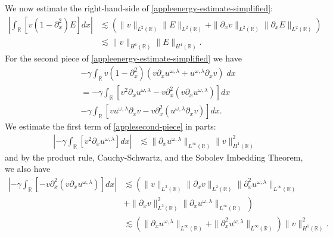 \documentclass[12pt,reqno]{amsart}
\newcommand{\rr}{\mathbb{R}}
\newcommand{\p}{\partial}
\theoremstyle{plain}  %
\theoremstyle{definition}
\begin{document}
We now estimate the right-hand-side of \eqref{appleenergy-estimate-simplified}:
%
\begin{equation}
	\begin{split}
		\label{applefirst_piece}
	\left |\int_{\rr} \left [v (1- \p_x^2)E \right ] dx \right |
	& \lesssim
	\left( \|v\|_{L^2(\rr)}
	\|E\|_{L^2(\rr)} + \|\p_x v \|_{L^2(\rr)}
		\|\p_xE\|_{L^2(\rr)}\right)
	\\
	&
	\lesssim
	\|v\|_{H^1(\rr)} \|E\|_{H^1(\rr)}.
\end{split}
\end{equation}
For the second piece of \eqref{appleenergy-estimate-simplified} we have
\begin{equation}
	\begin{split}
		\label{applesecond-piece}
		& -\gamma \int_{\rr} v\left( 1-\p_x^2 \right)\left( v \p_x u^{\omega,\lambda} +
		u^{\omega,\lambda} \p_x v
		\right) \; dx
		\\
		& = -\gamma \int_{\rr} \left[ v^2 \p_x u^{\omega,\lambda} - v \p_x^2\left( v \p_x u^{\omega,\lambda}
		\right) \right]dx
		\\
		&   -\gamma \int_{\rr}\left[ vu^{\omega,\lambda} \p_x v - v \p_x^2\left( u^{\omega,\lambda} \p_x v \right)
		\right]dx.
	\end{split}
\end{equation}
We estimate the first term of \eqref{applesecond-piece} in parts:
\begin{equation*}
	\begin{split}
		\left | -\gamma \int_{\rr} \left[ v^2 \p_x u^{\omega,\lambda} \right]dx \right |
		& \lesssim \|\p_x u^{\omega,\lambda} \|_{L^\infty(\rr)} \|v\|_{H^1(\rr)}^2
	\end{split}
\end{equation*}
and by the product rule, Cauchy-Schwartz, and the Sobolev Imbedding Theorem,
we also have 
\begin{equation*}
	\begin{split}
		\left |-  \gamma \int_{\rr} \left [-v \p_x^2 \left(v \p_x u^{\omega,\lambda}
		\right) \right ]  dx \right |
		& \lesssim \left ( \|v\|_{L^2(\rr)} \|\p_x v\|_{L^2(\rr)} \|\p_x^2
		u^{\omega,\lambda} \|_{L^\infty(\rr)} \right .
		\\
		&+ \|\p_x v \|_{L^2(\rr)}^2 \|\p_x u^{\omega,\lambda}\|_{L^\infty(\rr)} \left )
		\right .
		\\
		& \lesssim \left( \|\p_x u^{\omega,\lambda} \|_{L^\infty(\rr)}+ \|\p_x^2
		u^{\omega,\lambda} \|_{L^\infty(\rr)} \right )\|v\|_{H^1(\rr)}^2 .
	\end{split}
\end{equation*}
\end{document}
